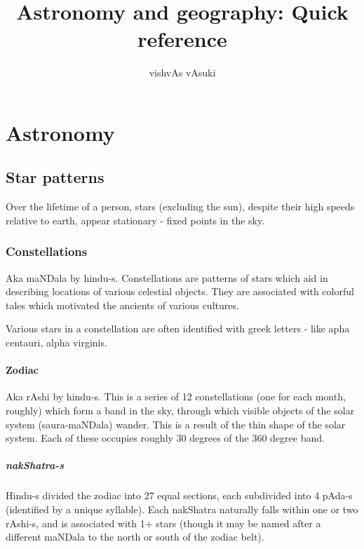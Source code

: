 \documentclass[oneside, article]{memoir}
\title{Astronomy and geography: Quick reference}
\author{vishvAs vAsuki}
\begin{document}
\maketitle
\tableofcontents

\part{Astronomy}
\chapter{Star patterns}
Over the lifetime of a person, stars (excluding the sun), despite their high speeds relative to earth, appear stationary - fixed points in the sky.

\section{Constellations}
Aka maNDala by hindu-s. Constellations are patterns of stars which aid in describing locations of various celestial objects. They are associated with colorful tales which motivated the ancients of various cultures.

Various stars in a constellation are often identified with greek letters - like apha centauri, alpha virginis.

\subsection{Zodiac}
Aka rAshi by hindu-s. This is a series of 12 constellations (one for each month, roughly) which form a band in the sky, through which visible objects of the solar system (saura-maNDala) wander. This is a result of the thin shape of the solar system. Each of these occupies roughly 30 degrees of the 360 degree band.

\subsubsection{nakShatra-s}
Hindu-s divided the zodiac into 27 equal sections, each subdivided into 4 pAda-s (identified by a unique syllable). Each nakShatra naturally falls within one or two rAshi-s, and is associated with 1+ stars (though it may be named after a different maNDala to the north or south of the zodiac belt).
\end{document}
